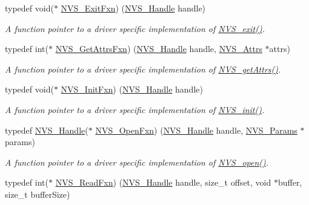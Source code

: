 \begin{DoxyCompactItemize}
typedef void($\ast$ \hyperlink{_n_v_s_8h_ab15ab786e165ed50b8c2e7f6bf9e3173}{N\+V\+S\+\_\+\+Exit\+Fxn}) (\hyperlink{_n_v_s_8h_a1ee0bd7b3cd443236454a8cb1f56ad44}{N\+V\+S\+\_\+\+Handle} handle)
\begin{DoxyCompactList}\small\item\em A function pointer to a driver specific implementation of \hyperlink{_n_v_s_8h_aa72b8cbb46bfc2a9e61102144a58b554}{N\+V\+S\+\_\+exit()}. \end{DoxyCompactList}\item 
typedef int($\ast$ \hyperlink{_n_v_s_8h_a6f07b7dcd80b867b79f84152c449f059}{N\+V\+S\+\_\+\+Get\+Attrs\+Fxn}) (\hyperlink{_n_v_s_8h_a1ee0bd7b3cd443236454a8cb1f56ad44}{N\+V\+S\+\_\+\+Handle} handle, \hyperlink{struct_n_v_s___attrs}{N\+V\+S\+\_\+\+Attrs} $\ast$attrs)
\begin{DoxyCompactList}\small\item\em A function pointer to a driver specific implementation of \hyperlink{_n_v_s_8h_a6b92f45097f377824524f7a4f33f02b1}{N\+V\+S\+\_\+get\+Attrs()}. \end{DoxyCompactList}\item 
typedef void($\ast$ \hyperlink{_n_v_s_8h_ad2e24ef1cb8bad08b75bc36c6a9cc36d}{N\+V\+S\+\_\+\+Init\+Fxn}) (\hyperlink{_n_v_s_8h_a1ee0bd7b3cd443236454a8cb1f56ad44}{N\+V\+S\+\_\+\+Handle} handle)
\begin{DoxyCompactList}\small\item\em A function pointer to a driver specific implementation of \hyperlink{_n_v_s_8h_a94e249f718eba502cdf34d098c83209e}{N\+V\+S\+\_\+init()}. \end{DoxyCompactList}\item 
typedef \hyperlink{_n_v_s_8h_a1ee0bd7b3cd443236454a8cb1f56ad44}{N\+V\+S\+\_\+\+Handle}($\ast$ \hyperlink{_n_v_s_8h_ad4be882e6ffecd7d54c3daa02a41752b}{N\+V\+S\+\_\+\+Open\+Fxn}) (\hyperlink{_n_v_s_8h_a1ee0bd7b3cd443236454a8cb1f56ad44}{N\+V\+S\+\_\+\+Handle} handle, \hyperlink{struct_n_v_s___params}{N\+V\+S\+\_\+\+Params} $\ast$params)
\begin{DoxyCompactList}\small\item\em A function pointer to a driver specific implementation of \hyperlink{_n_v_s_8h_ad3a3d1f1477312eeee6d2c907a25bd67}{N\+V\+S\+\_\+open()}. \end{DoxyCompactList}\item 
typedef int($\ast$ \hyperlink{_n_v_s_8h_ac5f94f84441e53eecbb1e3e6af41f019}{N\+V\+S\+\_\+\+Read\+Fxn}) (\hyperlink{_n_v_s_8h_a1ee0bd7b3cd443236454a8cb1f56ad44}{N\+V\+S\+\_\+\+Handle} handle, size\+\_\+t offset, void $\ast$buffer, size\+\_\+t buffer\+Size)

\end{DoxyCompactItemize}

